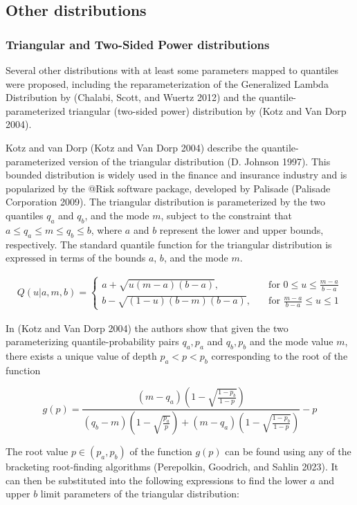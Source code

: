 \documentclass[
]{interact}
\begin{document}
\subsection{Other distributions}\label{other-distributions}

\subsubsection{Triangular and Two-Sided Power
distributions}\label{triangular-and-two-sided-power-distributions}

Several other distributions with at least some parameters mapped to
quantiles were proposed, including the reparameterization of the
Generalized Lambda Distribution by (Chalabi, Scott, and Wuertz 2012) and
the quantile-parameterized triangular (two-sided power) distribution by
(Kotz and Van Dorp 2004).

Kotz and van Dorp (Kotz and Van Dorp 2004) describe the
quantile-parameterized version of the triangular distribution (D.
Johnson 1997). This bounded distribution is widely used in the finance
and insurance industry and is popularized by the @Risk software package,
developed by Palisade (Palisade Corporation 2009). The triangular
distribution is parameterized by the two quantiles \(q_{a}\) and
\(q_{b}\), and the mode \(m\), subject to the constraint that
\(a\leq q_a\leq m\leq q_b\leq b\), where \(a\) and \(b\) represent the
lower and upper bounds, respectively. The standard quantile function for
the triangular distribution is expressed in terms of the bounds \(a\),
\(b\), and the mode \(m\).

\[
\begin{gathered}
Q(u\vert a,m,b)=\begin{cases}
a+\sqrt{u(m-a)(b-a)}, &\quad \text{for } 0\leq u \leq\frac{m-a}{b-a}\\
b-\sqrt{(1-u)(b-m)(b-a)}, &\quad \text{for } \frac{m-a}{b-a}\leq u \leq 1
\end{cases}
\end{gathered}
\]

In (Kotz and Van Dorp 2004) the authors show that given the two
parameterizing quantile-probability pairs \({q_a,p_a}\) and
\({q_b,p_b}\) and the mode value \(m\), there exists a unique value of
depth \(p_a<p<p_b\) corresponding to the root of the function

\[
g(p)=\frac{(m-q_a)(1-\sqrt{\frac{1-p_b}{1-p}})}{(q_b-m)(1-\sqrt{\frac{p_a}{p}})+(m-q_a)(1-\sqrt{\frac{1-p_b}{1-p}})}-p
\]

The root value \(p\in (p_a,p_b)\) of the function \(g(p)\) can be found
using any of the bracketing root-finding algorithms (Perepolkin,
Goodrich, and Sahlin 2023). It can then be substituted into the
following expressions to find the lower \(a\) and upper \(b\) limit
parameters of the triangular distribution:
\end{document}
